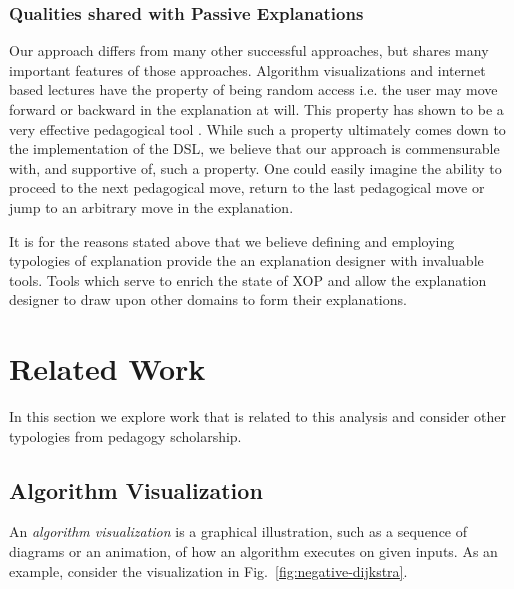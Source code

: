 \documentclass[conference]{IEEEtran}
\begin{document}
\subsubsection{Qualities shared with Passive Explanations}
Our approach differs from many other successful approaches,  but shares many important features of those approaches.
Algorithm visualizations and internet based lectures have the property of being
random access i.e. the user may move forward or backward in the explanation at
will. This property has shown to be a very effective pedagogical tool
. While such a property ultimately comes
down to the implementation of the DSL, we believe that our approach is
commensurable with, and supportive of, such a property. One could easily imagine
the ability to proceed to the next pedagogical move, return to the last
pedagogical move or jump to an arbitrary move in the explanation.

It is for the reasons stated above that we believe defining and employing
typologies of explanation provide the an explanation designer with invaluable
tools. Tools which serve to enrich the state of XOP and allow the explanation
designer to draw upon other domains to form their explanations.

\section{Related Work}
\label{sec:rw}

In this section we explore work that is related to this analysis and consider other
typologies from pedagogy scholarship.

\subsection{Algorithm Visualization}
\label{sec:rw:vis}


An \emph{algorithm visualization} is a graphical illustration, such as a
sequence of diagrams or an animation, of how an algorithm executes on given
inputs. As an example, consider the visualization in
Fig.~\ref{fig:negative-dijkstra}.


\end{document}
